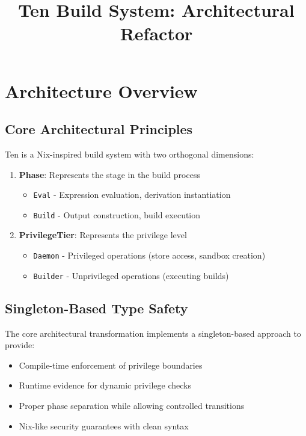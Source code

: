 \documentclass{article}
\title{Ten Build System: Architectural Refactor}
\author{}
\date{}
\begin{document}
\maketitle

\section{Architecture Overview}

\subsection{Core Architectural Principles}

Ten is a Nix-inspired build system with two orthogonal dimensions:

\begin{enumerate}
    \item \textbf{Phase}: Represents the stage in the build process
    \begin{itemize}
        \item \texttt{Eval} - Expression evaluation, derivation instantiation
        \item \texttt{Build} - Output construction, build execution
    \end{itemize}

    \item \textbf{PrivilegeTier}: Represents the privilege level
    \begin{itemize}
        \item \texttt{Daemon} - Privileged operations (store access, sandbox creation)
        \item \texttt{Builder} - Unprivileged operations (executing builds)
    \end{itemize}
\end{enumerate}

\subsection{Singleton-Based Type Safety}

The core architectural transformation implements a singleton-based approach to provide:

\begin{itemize}
    \item Compile-time enforcement of privilege boundaries
    \item Runtime evidence for dynamic privilege checks
    \item Proper phase separation while allowing controlled transitions
    \item Nix-like security guarantees with clean syntax
\end{itemize}
\end{document}
